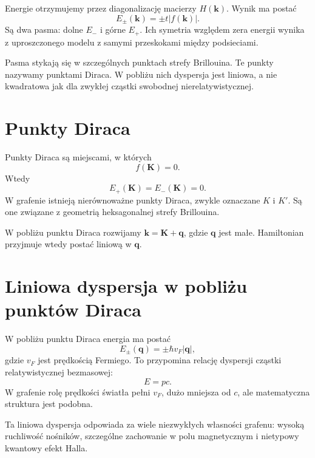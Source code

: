 Energie otrzymujemy przez diagonalizację macierzy \(H(\mathbf{k})\). Wynik ma postać
\begin{equation}
    E_\pm(\mathbf{k})=\pm t|f(\mathbf{k})|.
\end{equation}
Są dwa pasma: dolne \(E_-\) i górne \(E_+\). Ich symetria względem zera energii wynika z uproszczonego modelu z samymi przeskokami między podsieciami.

Pasma stykają się w szczególnych punktach strefy Brillouina. Te punkty nazywamy punktami Diraca. W pobliżu nich dyspersja jest liniowa, a nie kwadratowa jak dla zwykłej cząstki swobodnej nierelatywistycznej.

\section{Punkty Diraca}

Punkty Diraca są miejscami, w których
\begin{equation}
    f(\mathbf{K})=0.
\end{equation}
Wtedy
\begin{equation}
    E_+(\mathbf{K})=E_-(\mathbf{K})=0.
\end{equation}
W grafenie istnieją nierównoważne punkty Diraca, zwykle oznaczane \(K\) i \(K'\). Są one związane z geometrią heksagonalnej strefy Brillouina.

W pobliżu punktu Diraca rozwijamy \(\mathbf{k}=\mathbf{K}+\mathbf{q}\), gdzie \(\mathbf{q}\) jest małe. Hamiltonian przyjmuje wtedy postać liniową w \(\mathbf{q}\).

\section{Liniowa dyspersja w pobliżu punktów Diraca}

W pobliżu punktu Diraca energia ma postać
\begin{equation}
    E_\pm(\mathbf{q})=\pm \hbar v_F |\mathbf{q}|,
\end{equation}
gdzie \(v_F\) jest prędkością Fermiego. To przypomina relację dyspersji cząstki relatywistycznej bezmasowej:
\begin{equation}
    E=pc.
\end{equation}
W grafenie rolę prędkości światła pełni \(v_F\), dużo mniejsza od \(c\), ale matematyczna struktura jest podobna.

Ta liniowa dyspersja odpowiada za wiele niezwykłych własności grafenu: wysoką ruchliwość nośników, szczególne zachowanie w polu magnetycznym i nietypowy kwantowy efekt Halla.


